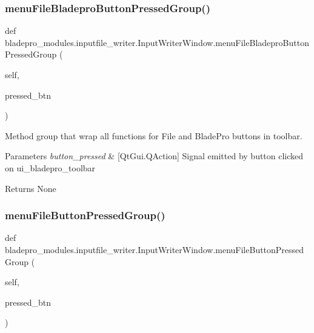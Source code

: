 \subsubsection{\texorpdfstring{menu\+File\+Bladepro\+Button\+Pressed\+Group()}{menuFileBladeproButtonPressedGroup()}}
{\footnotesize\ttfamily def bladepro\+\_\+modules.\+inputfile\+\_\+writer.\+Input\+Writer\+Window.\+menu\+File\+Bladepro\+Button\+Pressed\+Group (\begin{DoxyParamCaption}\item[{}]{self,  }\item[{}]{pressed\+\_\+btn }\end{DoxyParamCaption})}



Method group that wrap all functions for File and Blade\+Pro buttons in toolbar. 


\begin{DoxyParams}{Parameters}
{\em button\+\_\+pressed} & \mbox{[}Qt\+Gui.\+Q\+Action\mbox{]} Signal emitted by button clicked on ui\+\_\+bladepro\+\_\+toolbar \\
\hline
\end{DoxyParams}
\begin{DoxyReturn}{Returns}
None 
\end{DoxyReturn}
\hypertarget{a00070_a35cf87c6230239ce47b33bda03bd7432}{}\label{a00070_a35cf87c6230239ce47b33bda03bd7432} 
\subsubsection{\texorpdfstring{menu\+File\+Button\+Pressed\+Group()}{menuFileButtonPressedGroup()}}
{\footnotesize\ttfamily def bladepro\+\_\+modules.\+inputfile\+\_\+writer.\+Input\+Writer\+Window.\+menu\+File\+Button\+Pressed\+Group (\begin{DoxyParamCaption}\item[{}]{self,  }\item[{}]{pressed\+\_\+btn }\end{DoxyParamCaption})}



